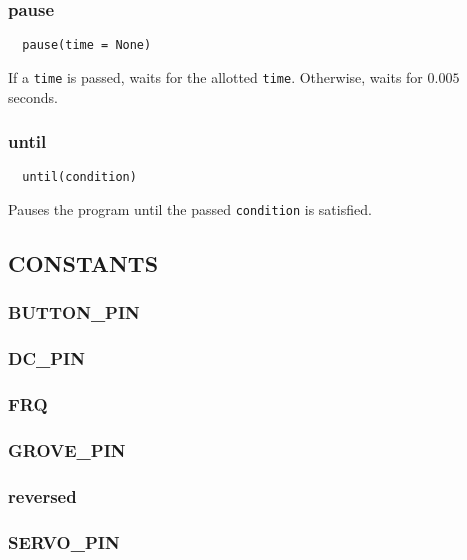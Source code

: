 \documentclass[12pt]{scrartcl} %
\begin{document}
\subsubsection{pause}

\begin{verbatim}
  pause(time = None)
\end{verbatim}

If a \texttt{time} is passed, waits for the allotted
\texttt{time}. Otherwise, waits for $0.005$ seconds.

\subsubsection{until}

\begin{verbatim}
  until(condition)
\end{verbatim}

Pauses the program until the passed \texttt{condition} is
satisfied.

\subsection{CONSTANTS}

\subsubsection{BUTTON\_PIN}

\subsubsection{DC\_PIN}

\subsubsection{FRQ}

\subsubsection{GROVE\_PIN}

\subsubsection{reversed}

\subsubsection{SERVO\_PIN}

\end{document}
